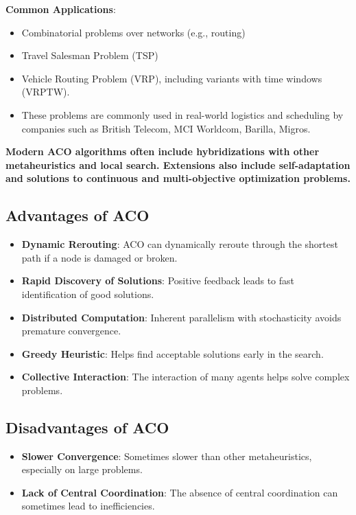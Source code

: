 \textbf{Common Applications}:
\begin{itemize}
    \item Combinatorial problems over networks (e.g., routing)
    \item Travel Salesman Problem (TSP)
    \item Vehicle Routing Problem (VRP), including variants with time windows (VRPTW).
    \item These problems are commonly used in real-world logistics and scheduling by companies such as British Telecom, MCI Worldcom, Barilla, Migros.
\end{itemize}
\textbf{Modern ACO algorithms often include hybridizations with other metaheuristics and local search. Extensions also include self-adaptation and solutions to continuous and multi-objective optimization problems.}

\subsection*{Advantages of ACO}
\begin{itemize}
    \item \textbf{Dynamic Rerouting}:  ACO can dynamically reroute through the shortest path if a node is damaged or broken.
    \item \textbf{Rapid Discovery of Solutions}: Positive feedback leads to fast identification of good solutions.
    \item \textbf{Distributed Computation}: Inherent parallelism with stochasticity avoids premature convergence.
    \item \textbf{Greedy Heuristic}: Helps find acceptable solutions early in the search.
    \item \textbf{Collective Interaction}: The interaction of many agents helps solve complex problems.
\end{itemize}
\subsection*{Disadvantages of ACO}
\begin{itemize}
    \item \textbf{Slower Convergence}: Sometimes slower than other metaheuristics, especially on large problems.
    \item \textbf{Lack of Central Coordination}: The absence of central coordination can sometimes lead to inefficiencies.
\end{itemize}
